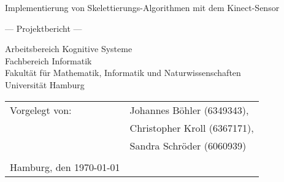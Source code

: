 \documentclass[
	12pt,
	a4paper,
	BCOR10mm,
	DIV14,
	listof=totoc,
	bibliography=totoc,
	headsepline
]{scrreprt}
\begin{document}
\begin{titlepage}
	\begin{center}
		{\titlefont\huge Implementierung von Skelettierungs-Algorithmen mit dem Kinect-Sensor\par}

		\bigskip
		\bigskip

		{\titlefont\Large --- Projektbericht ---\par}

		\bigskip
		\bigskip

		{\large Arbeitsbereich Kognitive Systeme\\
		Fachbereich Informatik\\
		Fakultät für Mathematik, Informatik und Naturwissenschaften\\
		Universität Hamburg\par}
	\end{center}
	
	\vfill
	
	{\large \begin{tabular}{ll}
		Vorgelegt von: & Johannes Böhler (6349343), \\
				& Christopher Kroll (6367171), \\ 
				& Sandra Schröder (6060939) \\\\
		Hamburg, den \today
	  \end{tabular}\par}

\end{titlepage}

\newcommand{\Autor}[1]{{\hfill \Large \textit{Autor: #1}}}




\tableofcontents



%



%




\appendix			%



\cleardoublepage
\thispagestyle{empty}
\chapter*{}
\end{document}
